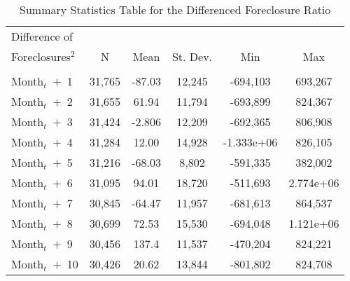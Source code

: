 \
\begin{table}[H]
\caption{Summary Statistics Table for the Differenced Foreclosure Ratio} \label{tab:lnHV}
\begin{center}
\begin{tabular}{lccccc} \hline

Difference of   &  &  &  &  & \\
Foreclosures$^2$ & N & Mean & St. Dev. & Min & Max  \\\hline
\vspace{4pt} & \begin{footnotesize}\end{footnotesize} & \begin{footnotesize}\end{footnotesize} & \begin{footnotesize}\end{footnotesize} & \begin{footnotesize}\end{footnotesize} & \begin{footnotesize}\end{footnotesize} \\




 Month$_t$\ $+$\ 1  & 31,765 & -87.03 & 12,245 & -694,103 & 693,267 \\
 Month$_t$\ $+$\ 2 & 31,655 & 61.94 & 11,794 & -693,899 & 824,367 \\

 Month$_t$\ $+$\ 3 & 31,424 & -2.806 & 12,209 & -692,365 & 806,908 \\

 Month$_t$\ $+$\ 4 & 31,284 & 12.00 & 14,928 & -1.333e+06 & 826,105 \\

Month$_t$\ $+$\ 5& 31,216 & -68.03 & 8,802 & -591,335 & 382,002 \\

 Month$_t$\ $+$\ 6 & 31,095 & 94.01 & 18,720 & -511,693 & 2.774e+06 \\

 Month$_t$\ $+$\ 7 & 30,845 & -64.47 & 11,957 & -681,613 & 864,537 \\

 Month$_t$\ $+$\ 8  & 30,699 & 72.53 & 15,530 & -694,048 & 1.121e+06 \\

 Month$_t$\ $+$\ 9 & 30,456 & 137.4 & 11,537 & -470,204 & 824,221 \\

 Month$_t$\ $+$\ 10& 30,426 & 20.62 & 13,844 & -801,802 & 824,708 \\


\end{tabular}
\end{center}
\end{table}
